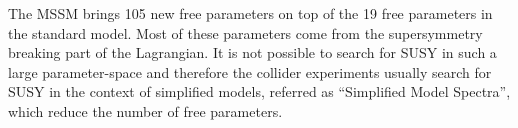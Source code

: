 

The MSSM brings 105 new free parameters on top of the 19 free parameters in the standard model. Most of these parameters come from the supersymmetry breaking part of the Lagrangian. It is not possible to search for SUSY in such a large parameter-space and therefore the collider experiments usually search for SUSY in the context of simplified models, referred as ``Simplified Model Spectra'', which reduce the number of free parameters.





